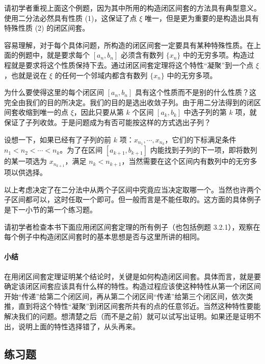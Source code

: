 \begin{xremark}
请初学者重视上面这个例题，因为其中所用的构造闭区间套的方法具有典型意义。使用二分法必然具有性质 (1)，这保证了点 $\xi$ 唯一，但是更为重要的是构造出具有特殊性质 (2) 的闭区间套。
\end{xremark}

容易理解，对于每个具体问题，所构造的闭区间套一定要具有某种特殊性质。在上面的例题中，就是要求每个 $[a_n,b_n]$ 必须含有数列 $\{x_n\}$ 中的无穷多项。构造过程就是要求将这个性质保持下去。通过闭区间套定理将这个特性“凝聚”到一个点 $\xi$，也就是说在 $\xi$ 的任何一个邻域内都含有数列 $\{x_n\}$ 中的无穷多项。

为什么要使得这里的每个闭区间 $[a_n,b_n]$ 具有这个性质而不是别的什么性质？这完全由我们的目的所决定。我们的目的是选出收敛子列。由于用二分法得到的闭区间套收缩到唯一的点 $\xi$，因此只要从第 $k$ 个区间 $[a_k,b_k]$ 中选子列的第 $k$ 项，就保证了子列收敛。于是问题成为有否可能按这样的方式选出子列？

设想一下，如果已经有了子列的前 $k$ 项：$x_{n_1},\cdots,x_{n_k}$，它们的下标满足条件 $n_1<n_2<\cdots<n_k$。为了在区间 $[a_{k+1},b_{k+1}]$ 内能找到子列的下一项，即将数列的某一项选为 $x_{n_{k+1}}$，满足 $n_k<n_{k+1}$，当然需要在这个区间内有数列中的无穷多项以供选择。

以上考虑决定了在二分法中从两个子区间中究竟应当决定取哪一个。当然也许两个子区间都可以，这时任取一个即可。但一般而言是不能任取的。这方面的具体例子是下一小节的第一个练习题。

请初学者检查本书下面应用闭区间套定理的所有例子（也包括例题 3.2.1），观察在每个例子中构造闭区间套时的基本思想是否与这里所讲的相同。

\paragraph{小结}
在用闭区间套定理证明某个结论时，关键是如何构造闭区间套。具体而言，就是要确定该闭区间套应该具有什么样的特性。构造过程应该使这种特性从第一个闭区间开始“传递”给第二个闭区间，再从第二个闭区间“传递”给第三个闭区间，依次类推，直到将这个特性“凝聚”到闭区间套所共有的点的任意邻近。当然这种特性要能解决我们的问题。想清楚之后（而不是之前）就可以试写出证明。如果还是证明不出，说明上面的特性选择错了，从头再来。

\subsection{练习题}

